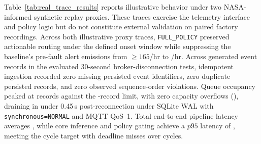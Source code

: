 \documentclass[conference]{IEEEtran}
\begin{document}
Table~\ref{tab:real_trace_results} reports illustrative behavior under two NASA-informed synthetic replay proxies. These traces exercise the telemetry interface and policy logic but do not constitute external validation on paired factory recordings. Across both illustrative proxy traces, \texttt{FULL\_POLICY} preserved actionable routing under the defined onset window while suppressing the baseline's pre-fault alert emissions from $\ge 165$/hr to \IMSFAFull{}/hr. Across \SpoolStressGeneratedEvents{} generated event records in the evaluated 30-second broker-disconnection tests, idempotent ingestion recorded zero missing persisted event identifiers, zero duplicate persisted records, and zero observed sequence-order violations. Queue occupancy peaked at \SpoolStressPeakQueueDepth{} records against the \SpoolBufferCapacity{}-record limit, with zero capacity overflows (\SpoolOverflowCount{}), draining in under 0.45\,s post-reconnection under SQLite WAL with \texttt{synchronous=NORMAL} and MQTT QoS~1. Total end-to-end pipeline latency averages \MeanPipelineLatency{}, while core inference and policy gating achieve a $p95$ latency of \CorePNinetyFiveLatency{}, meeting the \TargetDeadlineMs{} cycle target with \DeadlineMissRate{} deadline misses over \LatencyCycleCount{} cycles.

\end{document}
